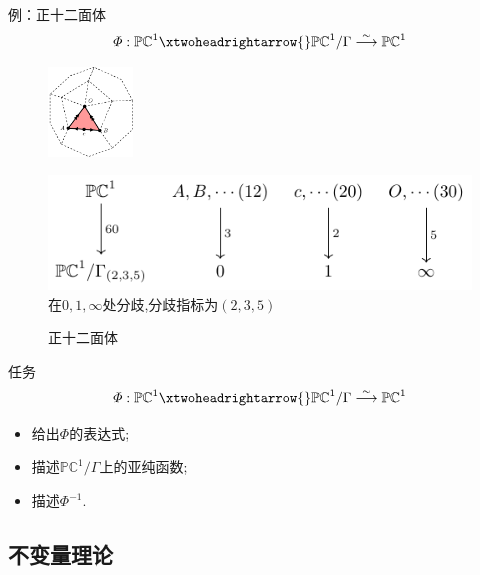 \documentclass[pdf]{beamer}
\numberwithin{equation}{section}
\theoremstyle{plain}
\theoremstyle{plain}
\theoremstyle{remark}
\begin{document}
	\begin{frame}{例：正十二面体}
	\hspace{-2em}
	$$\varPhi:\mathbb{PC}^1\xtwoheadrightarrow{}\mathbb{PC}^1/\Gamma\overset{\sim}{\longrightarrow}\mathbb{PC}^1$$
\begin{figure}[ht]
	
	\begin{minipage}[t]{.34\textwidth}
		\vspace{0.1cm}
		\centering
		\includegraphics[width=2.25cm]{poly/poly4-2.pdf}
		
	\end{minipage}
	\begin{minipage}[t]{.64\textwidth}
		\vspace{0.1cm}
		\centering
		\includegraphics[scale=0.75]{commu/commu2.pdf}\\[0cm]
		在$0,1,\infty$处分歧,分歧指标为$(2,3,5)$
	\end{minipage}
	\caption{正十二面体}
	\label{pic:comm2}
\end{figure}
\end{frame}

	\begin{frame}{任务}
\hspace{-2em}
$$\varPhi:\mathbb{PC}^1\xtwoheadrightarrow{}\mathbb{PC}^1/\Gamma\overset{\sim}{\longrightarrow}\mathbb{PC}^1$$

\begin{itemize}
	\item 给出$\varPhi$的表达式;
	\item 描述$\mathbb{PC}^1/\Gamma$上的亚纯函数;
	\item<0> 描述$\varPhi^{-1}$.
\end{itemize}
\end{frame}


\subsection{不变量理论}
\end{document}
